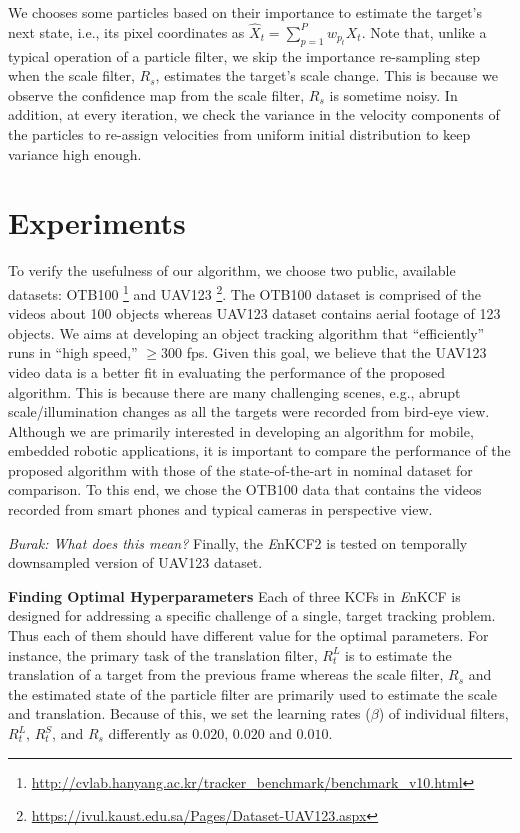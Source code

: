 \documentclass{bmvc2k}
\begin{document}
We chooses some particles based on their importance to estimate the
target's next state, i.e., its pixel coordinates as $\hat{X}_{t} =
\sum_{p=1}^{P}w_{p_{t}} X_{t}.$ Note that, unlike a typical operation
of a particle filter, we skip the importance re-sampling step when the
scale filter, $R_{s}$, estimates the target's scale change. This is
because we observe the confidence map from the scale filter, $R_s$ is
sometime noisy. In addition, at every iteration, we check the variance
in the velocity components of the particles to re-assign velocities
from uniform initial distribution to keep variance high enough.

\section{Experiments} \label{sc:Experiments}
To verify the usefulness of our algorithm, we choose two public,
available datasets:
OTB100 \footnote{\url{http://cvlab.hanyang.ac.kr/tracker_benchmark/benchmark_v10.html}}
and
UAV123 \footnote{\url{https://ivul.kaust.edu.sa/Pages/Dataset-UAV123.aspx}}\cite{mueller2016uav123}.
The OTB100 dataset is comprised of the videos about 100 objects
whereas UAV123 dataset contains aerial footage of 123 objects. We aims
at developing an object tracking algorithm that ``efficiently'' runs
in ``high speed,'' $\ge 300$ fps. Given this goal, we believe that the
UAV123 video data is a better fit in evaluating the performance of the
proposed algorithm. This is because there are many challenging scenes,
e.g., abrupt scale/illumination changes as all the targets were
recorded from bird-eye view. Although we are primarily interested in
developing an algorithm for mobile, embedded robotic applications, it
is important to compare the performance of the proposed algorithm with
those of the state-of-the-art in nominal dataset for comparison. To
this end, we chose the OTB100 data that contains the videos recorded
from smart phones and typical cameras in perspective view.

{\it Burak: What does this mean?}  Finally, the {\it E}nKCF2 is tested
on temporally downsampled version of UAV123 dataset.

\textbf{Finding Optimal Hyperparameters} Each of three KCFs in {\it
  E}nKCF is designed for addressing a specific challenge of a single,
target tracking problem. Thus each of them should have different value
for the optimal parameters. For instance, the primary task of the
translation filter, $R_{t}^{L}$ is to estimate the translation of a
target from the previous frame whereas the scale filter, $R_{s}$ and
the estimated state of the particle filter are primarily used to
estimate the scale and translation. Because of this, we set the
learning rates ($\beta$) of individual filters, $R_{t}^{L}$,
$R_{t}^{S}$, and $R_{s}$ differently as $0.020$, $0.020$ and
$0.010$. 
\end{document}
